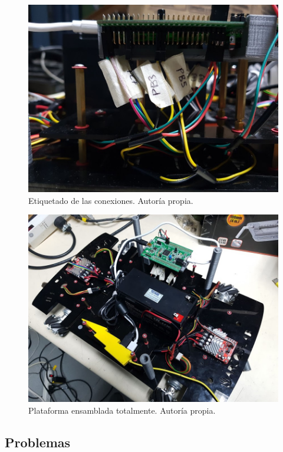\begin{figure}[H]
\centering
\includegraphics[scale=0.35]{imagenes/ensamble2.jpg}
\caption{Etiquetado de las conexiones. Autoría propia.}
\label{F:ensamble3}
\end{figure}

\begin{figure}[H]
\centering
\includegraphics[scale=0.35]{imagenes/ensamble1.jpg}
\caption{Plataforma ensamblada totalmente. Autoría propia.}
\label{F:ensamble4}
\end{figure}

\subsection{Problemas}

